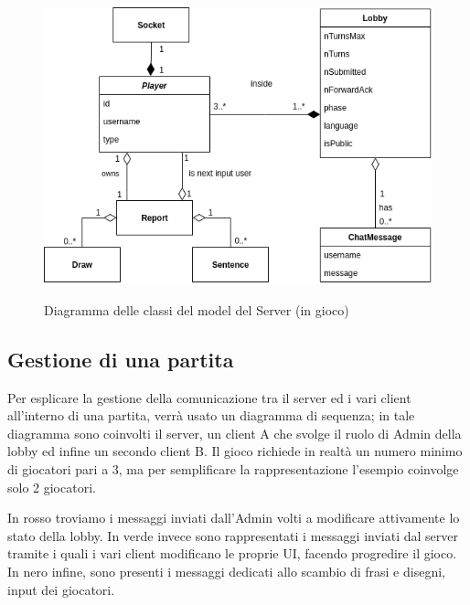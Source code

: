 \begin{figure}[H]
    \caption{Diagramma delle classi del model del Server (in gioco)}
    \centering
    \includegraphics[width=400mm]{img/uml/guessr_server_model.png}
    \label{fig:guessr_server_model}
\end{figure}

\subsection{Gestione di una partita}
Per esplicare la gestione della comunicazione tra il server ed i vari client all'interno di una partita, verrà usato un diagramma di sequenza; in tale diagramma sono coinvolti il server, un client A che svolge il ruolo di Admin della lobby ed infine un secondo client B.\newline
Il gioco richiede in realtà un numero minimo di giocatori pari a 3, ma per semplificare la rappresentazione l'esempio coinvolge solo 2 giocatori.\newline

\noindent In rosso troviamo i messaggi inviati dall'Admin volti a modificare attivamente lo stato della lobby.\newline
In verde invece sono rappresentati i messaggi inviati dal server tramite i quali i vari client modificano le proprie UI, facendo progredire il gioco.\newline
In nero infine, sono presenti i messaggi dedicati allo scambio di frasi e disegni, input dei giocatori.

